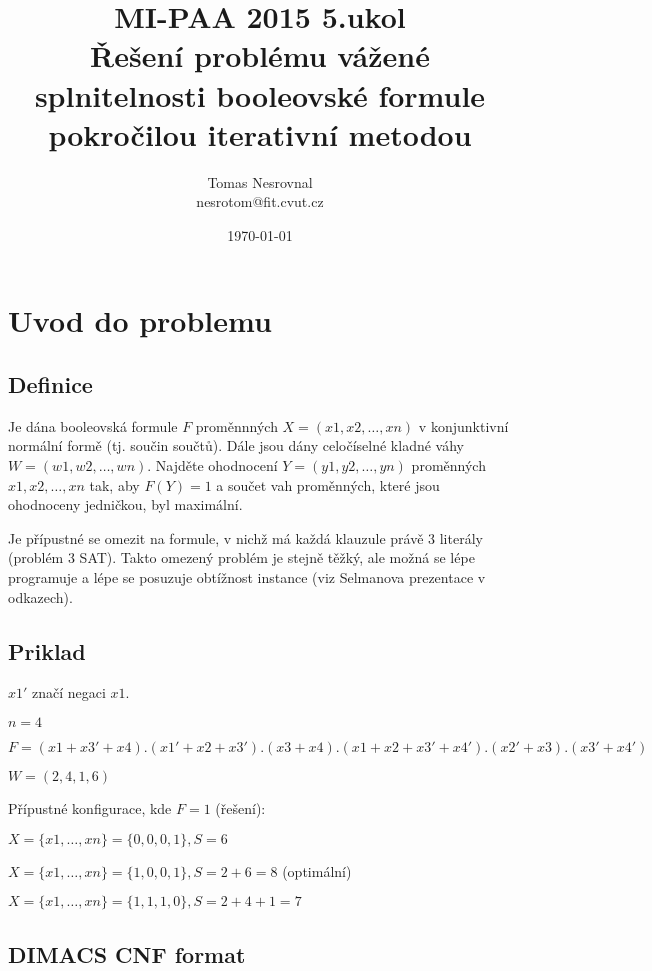 \documentclass[12pt,a4paper]{article}
\begin{document}
\title{MI-PAA 2015 5.ukol \\
Řešení problému vážené splnitelnosti booleovské formule pokročilou iterativní metodou
}
\author{Tomas Nesrovnal\\nesrotom@fit.cvut.cz}
\date{\today}
\maketitle

\newpage


\section{Uvod do problemu}

\subsection{Definice}
Je dána booleovská formule $F$ proměnnných $X=(x1, x2, … , xn)$ v konjunktivní normální formě (tj. součin součtů). Dále jsou dány celočíselné kladné váhy $W=(w1, w2, … , wn)$. Najděte ohodnocení $Y=(y1, y2, … , yn)$ proměnných $x1, x2, … , xn$ tak, aby $F(Y)=1$ a součet vah proměnných, které jsou ohodnoceny jedničkou, byl maximální.

Je přípustné se omezit na formule, v nichž má každá klauzule právě 3 literály (problém 3 SAT). Takto omezený problém je stejně těžký, ale možná se lépe programuje a lépe se posuzuje obtížnost instance (viz Selmanova prezentace v odkazech).

\subsection{Priklad}
$x1'$ značí negaci $x1$.

$n = 4$

$F = (x1 + x3' + x4).(x1' + x2 + x3').(x3 + x4).(x1 + x2 + x3' + x4').(x2' + x3).(x3' + x4')$ 

$W = (2, 4, 1, 6)$


Přípustné konfigurace, kde $F=1$ (řešení):

$X = \{x1, …,xn\} = \{0, 0, 0, 1\}, S = 6$

$X = \{x1, …,xn\} = \{1, 0, 0, 1\}, S = 2 + 6 = 8 $ (optimální)

$X = \{x1, …,xn\} = \{1, 1, 1, 0\}, S = 2 + 4 + 1 = 7$

\subsection{DIMACS CNF format}
\end{document}
